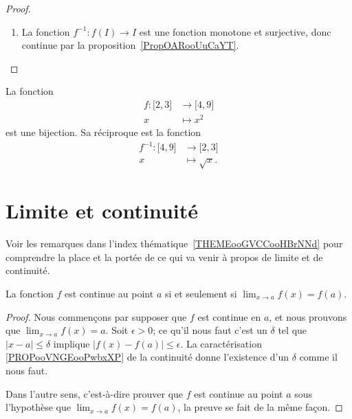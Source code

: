 \begin{proof}
\begin{enumerate}
\item

    La fonction \( f^{-1}\colon f(I)\to I\) est une fonction monotone et surjective, donc continue par la proposition~\ref{PropOARooUuCaYT}.

    \end{enumerate}
\end{proof}

\begin{example}
    La fonction
    \begin{equation}
        \begin{aligned}
            f\colon \mathopen[ 2 , 3 \mathclose]&\to \mathopen[ 4 , 9 \mathclose] \\
            x&\mapsto x^2
        \end{aligned}
    \end{equation}
    est une bijection. Sa réciproque est la fonction
    \begin{equation}
        \begin{aligned}
            f^{-1}\colon \mathopen[ 4 , 9 \mathclose]&\to \mathopen[ 2 , 3 \mathclose] \\
            x&\mapsto \sqrt{x}.
        \end{aligned}
    \end{equation}
\end{example}

\section{Limite et continuité}
\label{SecLimiteFontion}

Voir les remarques dans l'index thématique~\ref{THEMEooGVCCooHBrNNd} pour comprendre la place et la portée de ce qui va venir à propos de limite et de continuité.

\begin{theorem}           \label{ThoLimCont}
La fonction $f$ est continue au point $a$ si et seulement si $\lim_{x\to a}f(x)=f(a)$.
\end{theorem}

\begin{proof}
    Nous commençons par supposer que $f$ est continue en $a$, et nous prouvons que $\lim_{x\to a}f(x)=a$. Soit $\epsilon>0$; ce qu'il nous faut c'est un $\delta$ tel que $| x-a |\leq\delta$ implique $| f(x)-f(a) |\leq\epsilon$. La caractérisation \ref{PROPooVNGEooPwbxXP} de la continuité donne l'existence d'un $\delta$ comme il nous faut.

    Dans l'autre sens, c'est-à-dire prouver que $f$ est continue au point $a$ sous l'hypothèse que $\lim_{x\to a}f(x)=f(a)$, la preuve se fait de la même façon.
\end{proof}

